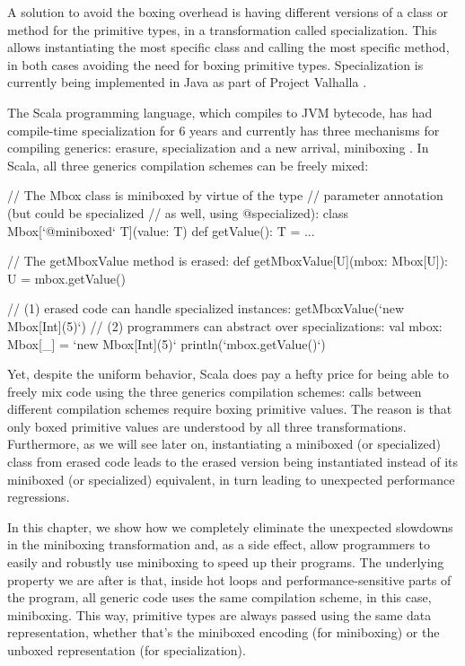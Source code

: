 A solution to avoid the boxing overhead is having different versions of a class or method for the primitive types, in a transformation called specialization. This allows instantiating the most specific class and calling the most specific method, in both cases avoiding the need for boxing primitive types. Specialization is currently being implemented in Java as part of Project Valhalla \cite{goetz-specialization, rose-value-classes-tearing, rose-value-classes-vm}.

The Scala programming language, which compiles to JVM bytecode, has had compile-time specialization for 6 years \cite{iuli-thesis, specialization-iuli} and currently has three mechanisms for compiling generics: erasure, specialization and a new arrival, miniboxing \cite{miniboxing}. In Scala, all three generics compilation schemes can be freely mixed:

\begin{lstlisting-nobreak}
// The Mbox class is miniboxed by virtue of the type
// parameter annotation (but could be specialized
// as well, using @specialized):
class Mbox[`@miniboxed` T](value: T) {
  def getValue(): T = ...
}

// The getMboxValue method is erased:
def getMboxValue[U](mbox: Mbox[U]): U = mbox.getValue()

// (1) erased code can handle specialized instances:
getMboxValue(`new Mbox[Int](5)`)
// (2) programmers can abstract over specializations:
val mbox: Mbox[_] = `new Mbox[Int](5)`
println(`mbox.getValue()`)
\end{lstlisting-nobreak}

Yet, despite the uniform behavior, Scala does pay a hefty price for being able to freely mix code using the three generics compilation schemes: calls between different compilation schemes require boxing primitive values. The reason is that only boxed primitive values are understood by all three transformations. Furthermore, as we will see later on, instantiating a miniboxed (or specialized) class from erased code leads to the erased version being instantiated instead of its miniboxed (or specialized) equivalent, in turn leading to unexpected performance regressions.

In this chapter, we show how we completely eliminate the unexpected slowdowns in the miniboxing transformation and, as a side effect, allow programmers to easily and robustly use miniboxing to speed up their programs. The underlying property we are after is that, inside hot loops and performance-sensitive parts of the program, all generic code uses the same compilation scheme, in this case, miniboxing. This way, primitive types are always passed using the same data representation, whether that's the miniboxed encoding (for miniboxing) or the unboxed representation (for specialization).

